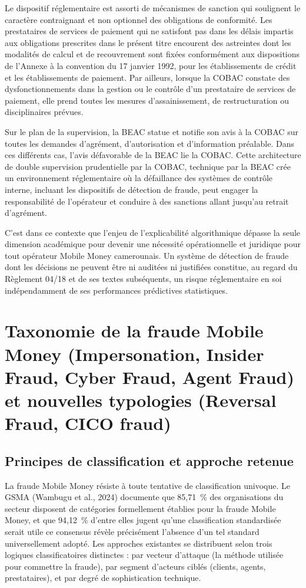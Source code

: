 \documentclass[11pt,a4paper,oneside]{report}
\theoremstyle{definition}
\theoremstyle{remark}
\begin{document}
Le dispositif réglementaire est assorti de mécanismes de sanction qui soulignent le caractère contraignant et non optionnel des obligations de conformité. Les prestataires de services de paiement qui ne satisfont pas dans les délais impartis aux obligations prescrites dans le présent titre encourent des astreintes dont les modalités de calcul et de recouvrement sont fixées conformément aux dispositions de l'Annexe à la convention du 17 janvier 1992, pour les établissements de crédit et les établissements de paiement. Par ailleurs, lorsque la COBAC constate des dysfonctionnements dans la gestion ou le contrôle d'un prestataire de services de paiement, elle prend toutes les mesures d'assainissement, de restructuration ou disciplinaires prévues.

Sur le plan de la supervision, la BEAC statue et notifie son avis à la COBAC sur toutes les demandes d'agrément, d'autorisation et d'information préalable. Dans ces différents cas, l'avis défavorable de la BEAC lie la COBAC. Cette architecture de double supervision  prudentielle par la COBAC, technique par la BEAC  crée un environnement réglementaire où la défaillance des systèmes de contrôle interne, incluant les dispositifs de détection de fraude, peut engager la responsabilité de l'opérateur et conduire à des sanctions allant jusqu'au retrait d'agrément.

C'est dans ce contexte que l'enjeu de l'explicabilité algorithmique dépasse la seule dimension académique pour devenir une nécessité opérationnelle et juridique pour tout opérateur Mobile Money camerounais. Un système de détection de fraude dont les décisions ne peuvent être ni auditées ni justifiées constitue, au regard du Règlement 04/18 et de ses textes subséquents, un risque réglementaire en soi  indépendamment de ses performances prédictives statistiques.

\section{Taxonomie de la fraude Mobile Money (Impersonation, Insider Fraud, Cyber Fraud, Agent Fraud) et nouvelles typologies (Reversal Fraud, CICO fraud)}

\subsection{Principes de classification et approche retenue}

La fraude Mobile Money résiste à toute tentative de classification univoque. Le GSMA (Wambugu et al., 2024) documente que 85,71~\% des organisations du secteur disposent de catégories formellement établies pour la fraude Mobile Money, et que 94,12~\% d'entre elles jugent qu'une classification standardisée serait utile  ce consensus révèle précisément l'absence d'un tel standard universellement adopté. Les approches existantes se distribuent selon trois logiques classificatoires distinctes : par vecteur d'attaque (la méthode utilisée pour commettre la fraude), par segment d'acteurs ciblés (clients, agents, prestataires), et par degré de sophistication technique.
\end{document}
